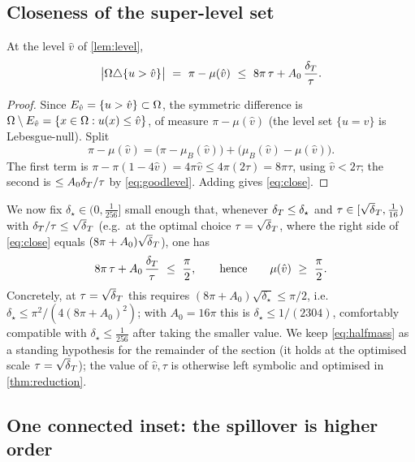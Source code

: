 \subsection{Closeness of the super-level set}

\begin{lemma}[Closeness]\label{lem:close}
At the level $\hat v$ of \cref{lem:level},
\begin{equation}\label{eq:close}
   \bigl|\Omega\triangle\{u>\hat v\}\bigr|
   \ =\ \pi-\mu(\hat v)
   \ \le\ 8\pi\,\tau+A_0\,\frac{\delta_T}{\tau}.
\end{equation}
\end{lemma}

\begin{proof}
Since $E_{\hat v}=\{u>\hat v\}\subset\Omega$, the symmetric difference is
$\Omega\setminus E_{\hat v}=\{x\in\Omega:u(x)\le\hat v\}$, of measure
$\pi-\mu(\hat v)$ (the level set $\{u=\hat v\}$ is Lebesgue-null). Split
\[
   \pi-\mu(\hat v)
   =\bigl(\pi-\mu_B(\hat v)\bigr)+\bigl(\mu_B(\hat v)-\mu(\hat v)\bigr).
\]
The first term is $\pi-\pi(1-4\hat v)=4\pi\hat v\le4\pi(2\tau)=8\pi\tau$,
using $\hat v<2\tau$; the second is $\le A_0\delta_T/\tau$ by
\eqref{eq:goodlevel}. Adding gives \eqref{eq:close}.
\end{proof}

\noindent
We now fix $\delta_\star\in(0,\tfrac1{256}]$ small enough that, whenever
$\delta_T\le\delta_\star$ and $\tau\in[\sqrt\dT,\tfrac1{16})$ with
$\dT/\tau\le\sqrt\dT$ (e.g.\ at the optimal choice $\tau=\sqrt\dT$, where
the right side of \eqref{eq:close} equals $(8\pi+A_0)\sqrt\dT$), one has
\begin{equation}\label{eq:halfmass}
   8\pi\,\tau+A_0\,\frac{\delta_T}{\tau}\ \le\ \frac\pi2,
   \qquad\text{hence}\qquad
   \mu(\hat v)\ \ge\ \frac\pi2 .
\end{equation}
Concretely, at $\tau=\sqrt\dT$ this requires $(8\pi+A_0)\sqrt{\delta_\star}
\le\pi/2$, i.e.\ $\delta_\star\le\pi^2/(4(8\pi+A_0)^2)$; with $A_0=16\pi$
this is $\delta_\star\le 1/(2304)$, comfortably compatible with
$\delta_\star\le\tfrac1{256}$ after taking the smaller value. We keep
\eqref{eq:halfmass} as a standing hypothesis for the remainder of the
section (it holds at the optimised scale $\tau=\sqrt\dT$); the value of
$\hat v,\tau$ is otherwise left symbolic and optimised in
\cref{thm:reduction}.

\subsection{One connected inset: the spillover is higher order}

